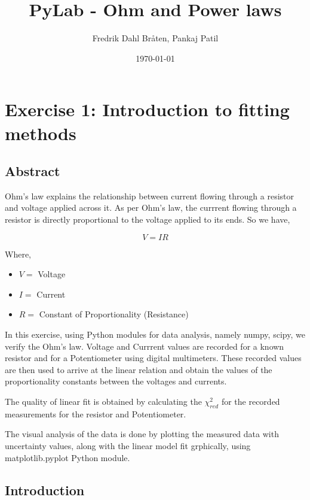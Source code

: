 \documentclass[letterpaper,12pt]{article}
\begin{document}
\title{PyLab - Ohm and Power laws}
\author{Fredrik Dahl Bråten, Pankaj Patil}
\date{\today}
\maketitle
\tableofcontents
\listoffigures
\listoftables

\pagebreak

\section{Exercise 1:  Introduction to fitting methods}

\subsection{Abstract}

Ohm's law explains the relationship between current flowing through a resistor and voltage applied across it.
As per Ohm's law, the currrent flowing through a resistor is directly proportional to the
voltage applied to its ends. So we have,

$$V = IR$$

Where,
\begin{itemize}
  \item[] $V=$ Voltage
  \item[] $I=$ Current
  \item[] $R=$ Constant of Proportionality (Resistance)
\end{itemize}

In this exercise, using Python modules for data analysis, namely numpy, scipy, we 
verify the Ohm's law. Voltage and Currrent values are recorded for a known resistor 
and for a Potentiometer using digital multimeters. These recorded values are then
used to arrive at the linear relation and obtain the values of the proportionality constants  between
the voltages and currents. 

The quality of linear fit is obtained by calculating the $\chi^2_{red}$ for the recorded measurements 
for the resistor and Potentiometer. 

The visual analysis of the data is done by plotting the measured data with uncertainty values, along with the linear model
fit grphically, using matplotlib.pyplot Python module.

\subsection{Introduction}
\end{document}
